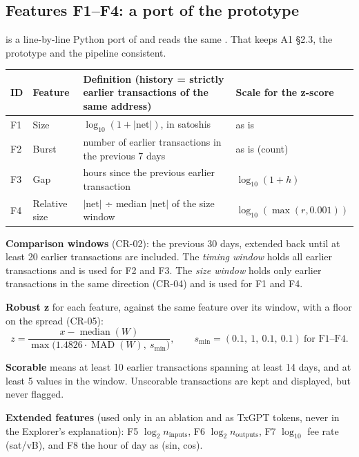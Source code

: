 \subsection{Features F1--F4: a port of the prototype}
\label{sec:features}

 is a line-by-line Python port of  and reads the same
. That keeps A1 §2.3, the prototype and the pipeline consistent.

\begin{center}
\small
\begin{tabularx}{\textwidth}{@{}L{1.0cm}L{2.1cm}Y L{3.3cm}@{}}
\toprule
\textbf{ID} & \textbf{Feature} & \textbf{Definition (history = strictly earlier transactions of the same address)} & \textbf{Scale for the z-score} \\
\midrule
F1 & Size & $\log_{10}(1 + |\text{net}|)$, in satoshis & as is \\
F2 & Burst & number of earlier transactions in the previous 7 days & as is (count) \\
F3 & Gap & hours since the previous earlier transaction & $\log_{10}(1+h)$ \\
F4 & Relative size & $|\text{net}|$ ÷ median $|\text{net}|$ of the size window & $\log_{10}(\max(r, 0.001))$ \\
\bottomrule
\end{tabularx}
\end{center}

\textbf{Comparison windows} (CR-02): the previous 30 days, extended back until at least 20 earlier
transactions are included. The \emph{timing window} holds all earlier transactions and is used for
F2 and F3. The \emph{size window} holds only earlier transactions in the same direction (CR-04)
and is used for F1 and F4.

\textbf{Robust z} for each feature, against the same feature over its window, with a floor on the
spread (CR-05):
\[
z = \frac{x - \operatorname{median}(W)}{\max\bigl(1.4826 \cdot \operatorname{MAD}(W),\ s_{\min}\bigr)},
\qquad s_{\min} = (0.1,\ 1,\ 0.1,\ 0.1)\ \text{for F1--F4}.
\]

\textbf{Scorable} means at least 10 earlier transactions spanning at least 14 days, and at least
5 values in the window. Unscorable transactions are kept and displayed, but never flagged.

\textbf{Extended features} (used only in an ablation and as TxGPT tokens, never in the
Explorer's explanation): F5 $\log_2 n_{\text{inputs}}$, F6 $\log_2 n_{\text{outputs}}$, F7
$\log_{10}$ fee rate (sat/vB), and F8 the hour of day as (sin, cos).

